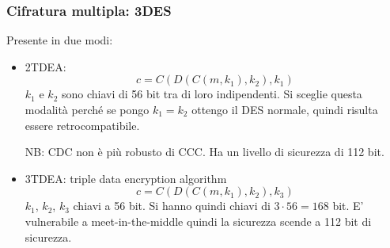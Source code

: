 \subsubsection{Cifratura multipla: 3DES}
Presente in due modi:
\begin{itemize}
    \item 2TDEA:
        $$ c = C(D(C(m, k_1), k_2), k_1) $$
        $k_1$ e $k_2$ sono chiavi di 56 bit tra di loro indipendenti. Si sceglie questa modalità perché se pongo $k_1 = k_2$ ottengo il DES normale, quindi risulta essere retrocompatibile.
        
        NB: CDC non è più robusto di CCC. Ha un livello di sicurezza di 112 bit.
    \item 3TDEA: triple data encryption algorithm
        $$ c = C(D(C(m, k_1), k_2), k_3) $$
        $k_1$, $k_2$, $k_3$ chiavi a 56 bit. Si hanno quindi chiavi di $3 \cdot 56 = 168$ bit. E' vulnerabile a meet-in-the-middle quindi la sicurezza scende a 112 bit di sicurezza.
\end{itemize}